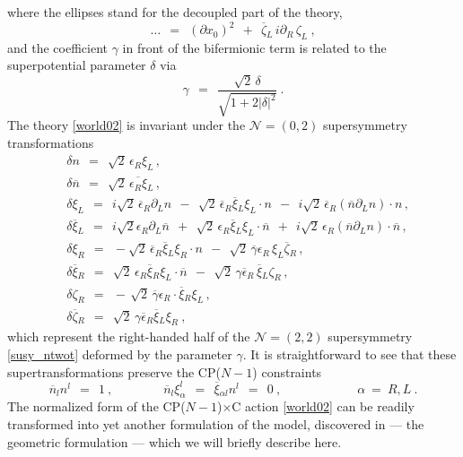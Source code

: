 \documentclass[12pt]{article}
\newcommand{\ntwot}{${\mathcal N}= \left(2,2\right) $ }
\newcommand{\ntwoo}{${\mathcal N}= \left(0,2\right) $ }
\newcommand{\p}{\partial}
\newcommand{\ov}{\overline}
\newcommand{\bxir}{\ov{\xi}{}_R}
\newcommand{\bxil}{\ov{\xi}{}_L}
\newcommand{\xir}{\xi_R}
\newcommand{\xil}{\xi_L}
\newcommand{\bzl}{\ov{\zeta}{}_L}
\newcommand{\bzr}{\ov{\zeta}{}_R}
\newcommand{\zr}{\zeta_R}
\newcommand{\zl}{\zeta_L}
\newcommand{\CPC}{CP($N-1$)$\times$C }
\begin{document}
	where the ellipses stand  for the decoupled part of the theory,
\[
	\dots ~~=~~ \left(\p x_0\right)^2 ~~+~~ \bzl\, i\p_R\, \zl ~,
\]
	and the coefficient $ \gamma $ in front of the bifermionic term is related to the superpotential parameter $ \delta $ via
\[
	\gamma ~~=~~ \frac { \sqrt{2}\,\delta } { \sqrt{ 1 +  2 |\delta|^2 } }~.
\]
	The theory \eqref{world02} is invariant under the \ntwoo supersymmetry transformations
\begin{align*}
%
	&
	\delta n ~~=~~ \sqrt{2}\, \epsilon_R \xil \,, \\[2mm]
%
	&
	 \delta\ov{n} ~~=~~ \sqrt{2}\, \ov{\epsilon_R \xi}{}_L\,,
	\\[2mm]
%
	&
	\delta\xil ~~=~~ i\sqrt{2}\, \ov{\epsilon}{}_R \p_L n ~~-~~ 
			\sqrt{2}\, \ov{\epsilon}{}_R \bxil\xil \cdot n ~~-~~
			i\sqrt{2}\, \ov{\epsilon}{}_R \left( \ov{n}\p_L n \right) \cdot n \,,\\[2mm]
%
	&
	\delta\bxil ~~=~~ i\sqrt{2}\epsilon_R \p_L \ov{n}  ~~+~~
			\sqrt{2}\,\epsilon_R \bxil\xil \cdot \ov{n} ~~+~~
			i\sqrt{2}\, \epsilon_R \left( \ov{n} \p_L n \right) \cdot \ov{n}\,, \\[2mm]
%
	& 
	\delta\xir ~~=~~ - \sqrt{2}\, \ov{\epsilon}{}_R \bxil\xir \cdot n 
		~~-~~ \sqrt{2}\, \ov{\gamma}\epsilon_R\, \xil \bzr \,,\\[2mm]
%
	&
	\delta\bxir  ~~=~~ \sqrt{2}\, \epsilon_R \bxir \xil \cdot \ov{n} 
		~~-~~ \sqrt{2}\, \gamma\ov{\epsilon}{}_R\, \bxil\zr \,,\\[2mm]
%
	&
	\delta\zeta_R ~~=~~ -\, \sqrt{2}\, \ov{\gamma}\epsilon_R \cdot \bxir\xil \,,\\[2mm]
%
	&
	\delta\ov{\zeta}{}_R ~~=~~ \sqrt{2}\, \gamma \ov{\epsilon}{}_R \bxil\xir~,
\end{align*}
	which represent the right-handed half of the \ntwot supersymmetry \eqref{susy_ntwot} 
	deformed by the parameter $ \gamma $.
	It is straightforward to see that these supertransformations preserve the CP($N-1$) constraints
\[
	\ov{n}{}_l n^l ~~=~~ 1~, \qquad\qquad  \ov{n}{}_l\xi_\alpha^l ~~=~~ \ov{\xi}{}_{\alpha l} n^l ~~=~~ 0~,
		\qquad\qquad\qquad  \alpha ~=~ R,L~.
\]
The normalized form of the \CPC action \eqref{world02} can be readily transformed into yet another
	formulation of the model, discovered in \cite{SYhet} --- the geometric formulation --- which we  will briefly describe here.
\end{document}
